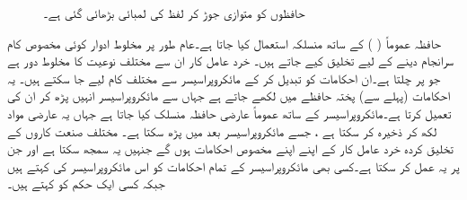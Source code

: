 \begin{figure}
\begin{subfigure}{0.55\textwidth}
\end{subfigure}\hfill
\begin{subfigure}{0.35\textwidth}
\centering
{}
\caption{}
\end{subfigure}
\caption{حافظوں کو متوازی جوڑ کر لفظ کی لمبائی بڑھائی گئی ہے۔}
\label{شکل_حافظہ_متوازی_جوڑنا}
\end{figure}

حافظہ عموماً  ( ) کے ساتھ منسلکہ استعمال کیا جاتا ہے۔عام طور پر مخلوط ادوار کوئی مخصوص کام سرانجام دینے کے لیے تخلیق کیے جاتے ہیں۔ خرد عامل کار ان سے مختلف نوعیت کا مخلوط دور ہے جو  پر چلتا ہے۔ان احکامات کو تبدیل کر کے مائکروپراسیسر سے مختلف کام لیے جا سکتے ہیں۔ یہ احکامات (پہلے سے) پختہ حافظے میں لکھے جاتے ہے جہاں سے مائکروپراسیسر انہیں پڑھ کر ان کی تعمیل کرتا ہے۔مائکروپراسیسر کے ساتھ عموماً عارضی حافظہ منسلک کیا جاتا ہے جہاں یہ عارضی مواد لکھ کر ذخیرہ کر سکتا ہے  ، جسے  مائکروپراسیسر بعد میں  پڑھ سکتا ہے۔ مختلف صنعت کاروں کے تخلیق کردہ خرد عامل کار کے اپنے اپنے مخصوص احکامات ہوں گے جنہیں یہ سمجھ سکتا ہے اور جن پر یہ عمل کر سکتا ہے۔کسی بھی مائکروپراسیسر کے تمام احکامات کو اس مائکروپراسیسر کی  کہتے ہیں جبکہ کسی ایک حکم کو کہتے ہیں۔

